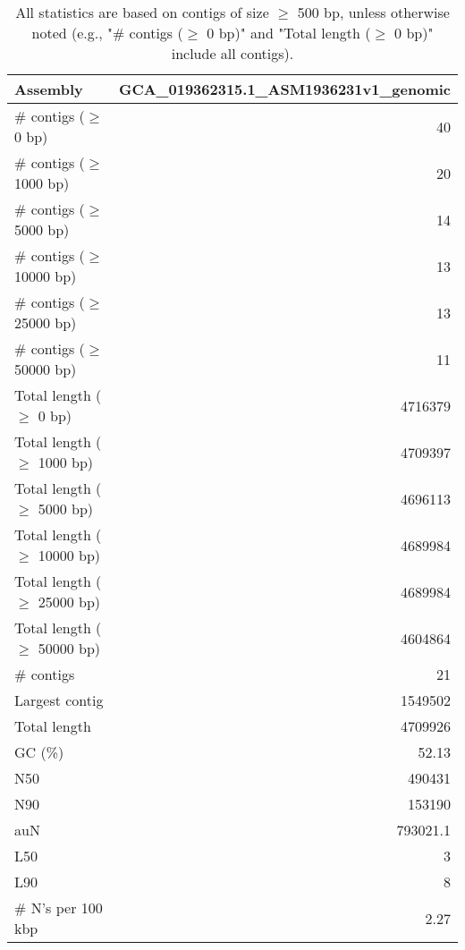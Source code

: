 \documentclass[12pt,a4paper]{article}
\begin{document}
\begin{table}[ht]
\begin{center}
\caption{All statistics are based on contigs of size $\geq$ 500 bp, unless otherwise noted (e.g., "\# contigs ($\geq$ 0 bp)" and "Total length ($\geq$ 0 bp)" include all contigs).}
\begin{tabular}{|l*{1}{|r}|}
\hline
Assembly & GCA\_019362315.1\_ASM1936231v1\_genomic \\ \hline
\# contigs ($\geq$ 0 bp) & 40 \\ \hline
\# contigs ($\geq$ 1000 bp) & 20 \\ \hline
\# contigs ($\geq$ 5000 bp) & 14 \\ \hline
\# contigs ($\geq$ 10000 bp) & 13 \\ \hline
\# contigs ($\geq$ 25000 bp) & 13 \\ \hline
\# contigs ($\geq$ 50000 bp) & 11 \\ \hline
Total length ($\geq$ 0 bp) & 4716379 \\ \hline
Total length ($\geq$ 1000 bp) & 4709397 \\ \hline
Total length ($\geq$ 5000 bp) & 4696113 \\ \hline
Total length ($\geq$ 10000 bp) & 4689984 \\ \hline
Total length ($\geq$ 25000 bp) & 4689984 \\ \hline
Total length ($\geq$ 50000 bp) & 4604864 \\ \hline
\# contigs & 21 \\ \hline
Largest contig & 1549502 \\ \hline
Total length & 4709926 \\ \hline
GC (\%) & 52.13 \\ \hline
N50 & 490431 \\ \hline
N90 & 153190 \\ \hline
auN & 793021.1 \\ \hline
L50 & 3 \\ \hline
L90 & 8 \\ \hline
\# N's per 100 kbp & 2.27 \\ \hline
\end{tabular}
\end{center}
\end{table}
\end{document}
